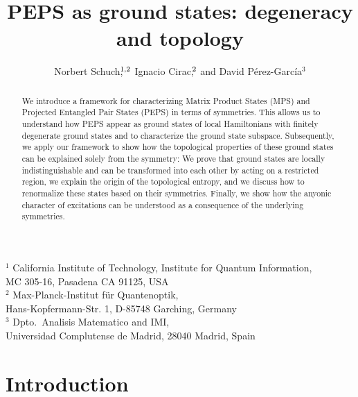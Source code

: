 \documentclass{article}
\title{PEPS as ground states: degeneracy and topology}
\author{Norbert Schuch,$\hspace*{-0.3em}^{1,2}$ 
    Ignacio Cirac,$\hspace*{-0.2em}^{2}$
    and David P\'erez-Garc\'ia$^{3}$}
\date{}
\theoremstyle{plain}
\theoremstyle{definition}
\numberwithin{equation}{section}  %
\begin{document}
\maketitle
\vspace*{-2.5em}
\begin{center}
    \footnotesize
    $^1$ California Institute of Technology, Institute for Quantum
    Information,\\
    MC 305-16, Pasadena CA 91125, USA\\
    $^2$ Max-Planck-Institut f\"ur Quantenoptik,\\ Hans-Kopfermann-Str. 1,
    D-85748 Garching, Germany\\
    $^3$ Dpto.\ Analisis Matematico and IMI,\\ Universidad Complutense de Madrid,
    28040 Madrid, Spain
\end{center}



\vspace{1em}


\begin{abstract}
    We introduce a framework for characterizing Matrix Product States (MPS)
    and Projected Entangled Pair States (PEPS) in terms of symmetries.  This
    allows us to understand how PEPS appear as ground states of
    local Hamiltonians with finitely degenerate ground states and to characterize
    the ground state subspace.  Subsequently, we apply our framework to show
    how the topological properties of these ground states can be explained
    solely from the symmetry: We prove that ground states are locally
    indistinguishable and can be transformed into each other by acting on a
    restricted region, we explain the origin of the topological entropy, and
    we discuss how to renormalize these states based on their symmetries.
    Finally, we show how the anyonic character of excitations can be
    understood as a consequence of the underlying symmetries.  \end{abstract}







\section{Introduction}
\end{document}

